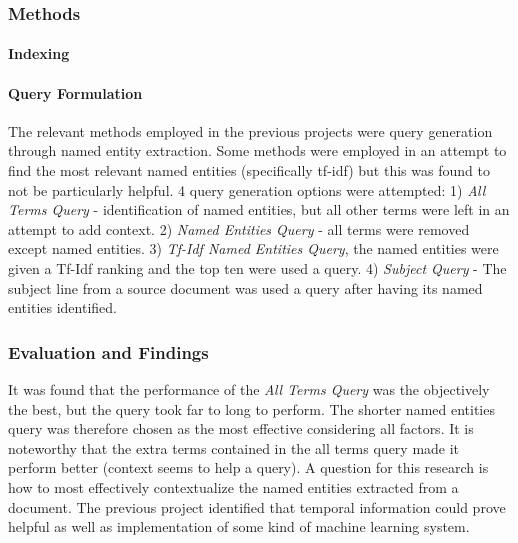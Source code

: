 \documentclass{mprop}
\begin{document}
\subsubsection{Methods}
\paragraph{Indexing}

\paragraph{Query Formulation}
The relevant methods employed in the previous projects were query generation through named entity extraction. Some methods were employed in an attempt to find the most relevant named entities (specifically tf-idf) but this was found to not be particularly helpful. 4 query generation options were attempted: 1) \textit{All Terms Query} - identification of named entities, but all other terms were left in an attempt to add context. 2) \textit{Named Entities Query} - all terms were removed except named entities. 3) \textit{Tf-Idf Named Entities Query}, the named entities were given a Tf-Idf ranking and the top ten were used a query. 4) \textit{Subject Query} - The subject line from a source document was used a query after having its named entities identified.

\subsubsection{Evaluation and Findings}
It was found that the performance of the \textit{All Terms Query} was the objectively the best, but the query took far to long to perform. The shorter named entities query was therefore chosen as the most effective considering all factors. It is noteworthy that the extra terms contained in the all terms query made it perform better (context seems to help a query). A question for this research is how to most effectively contextualize the named entities extracted from a document. The previous project identified that temporal information could prove helpful as well as implementation of some kind of machine learning system.
\end{document}
